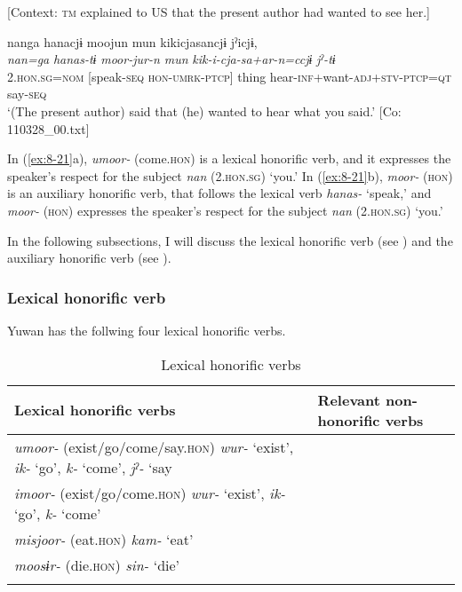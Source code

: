     [Context: \textsc{tm} explained to US that the present author had wanted to see her.]

{\TM}
\glll  nanga  hanacjɨ  moojun  mun    kikicjasancjɨ  jˀicjɨ,\\
\textit{nan=ga}  \textit{hanas-tɨ}  \textit{moor-jur-n  mun} \textit{kik-i-cja-sa+ar-n=ccjɨ}  \textit{jˀ-tɨ}\\
2.\textsc{hon}.\textsc{sg}=\textsc{nom}  [speak-\textsc{seq}  \textsc{hon}-\textsc{umrk}-\textsc{ptcp}]  thing   hear-\textsc{inf}+want-\textsc{adj}+\textsc{stv}-\textsc{ptcp}=\textsc{qt}  say-\textsc{seq}\\
\glt ‘(The present author) said that (he) wanted to hear what you said.’ [Co: 110328\_00.txt]
\z
\z

In (\ref{ex:8-21}a), \textit{umoor-} (come.\textsc{hon}) is a lexical honorific verb, and it expresses the speaker’s respect for the subject \textit{nan} (2.\textsc{hon}.\textsc{sg}) ‘you.’ In (\ref{ex:8-21}b), \textit{moor-} (\textsc{hon}) is an auxiliary honorific verb, that follows the lexical verb \textit{hanas-} ‘speak,’ and \textit{moor-} (\textsc{hon}) expresses the speaker’s respect for the subject \textit{nan} (2.\textsc{hon}.\textsc{sg}) ‘you.’

  In the following subsections, I will discuss the lexical honorific verb (see ) and the auxiliary honorific verb (see ).

\subsubsection{Lexical honorific verb}

Yuwan has the follwing four lexical honorific verbs.

\begin{table}
\caption{\label{tab:key:72}Lexical honorific verbs}
\begin{tabular}{ll}
\lsptoprule
Lexical honorific verbs  & Relevant non-honorific verbs\\
\midrule
\textit{umoor-} (exist/go/come/say.\textsc{hon})  \textit{wur-} ‘exist’, \textit{ik-} ‘go’, \textit{k-} ‘come’, \textit{jˀ-} ‘say\\
\textit{imoor-} (exist/go/come.\textsc{hon})  \textit{wur-} ‘exist’, \textit{ik-} ‘go’, \textit{k-} ‘come’                       \\
\textit{misjoor-} (eat.\textsc{hon})  \textit{kam-} ‘eat’                                                                        \\
\textit{moosɨr-} (die.\textsc{hon})  \textit{sin-} ‘die’
\\
\lspbottomrule
\end{tabular}
\end{table}

